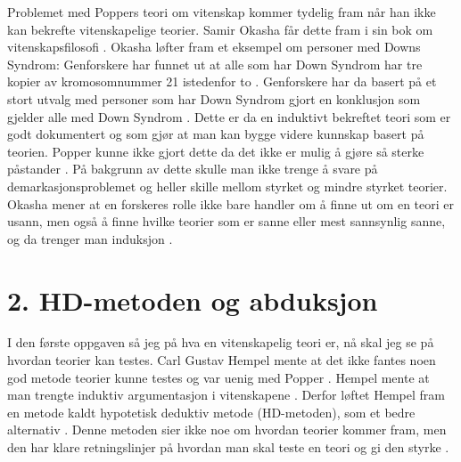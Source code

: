 \documentclass[
]{book}
\begin{document}
Problemet med Poppers teori om vitenskap kommer tydelig fram når han ikke kan bekrefte vitenskapelige teorier. Samir Okasha får dette fram i sin bok om vitenskapsfilosofi \citep{okasha2016}. Okasha løfter fram et eksempel om personer med Downs Syndrom: Genforskere har funnet ut at alle som har Down Syndrom har tre kopier av kromosomnummer 21 istedenfor to \citep[s. 18]{okasha2016}. Genforskere har da basert på et stort utvalg med personer som har Down Syndrom gjort en konklusjon som gjelder alle med Down Syndrom \citep{okasha2016}. Dette er da en induktivt bekreftet teori som er godt dokumentert og som gjør at man kan bygge videre kunnskap basert på teorien. Popper kunne ikke gjort dette da det ikke er mulig å gjøre så sterke påstander \citep{okasha2016}. På bakgrunn av dette skulle man ikke trenge å svare på demarkasjonsproblemet og heller skille mellom styrket og mindre styrket teorier. Okasha mener at en forskeres rolle ikke bare handler om å finne ut om en teori er usann, men også å finne hvilke teorier som er sanne eller mest sannsynlig sanne, og da trenger man induksjon \citep[s. 19-20]{okasha2016}.

\hypertarget{hd-metoden-og-abduksjon}{%
\section{2. HD-metoden og abduksjon}\label{hd-metoden-og-abduksjon}}

I den første oppgaven så jeg på hva en vitenskapelig teori er, nå skal jeg se på hvordan teorier kan testes. Carl Gustav Hempel mente at det ikke fantes noen god metode teorier kunne testes og var uenig med Popper \citep{hempel1966}. Hempel mente at man trengte induktiv argumentasjon i vitenskapene \citep{hempel1966}. Derfor løftet Hempel fram en metode kaldt hypotetisk deduktiv metode (HD-metoden), som et bedre alternativ \citep{hempel1966}. Denne metoden sier ikke noe om hvordan teorier kommer fram, men den har klare retningslinjer på hvordan man skal teste en teori og gi den styrke \citep{hempel1966}.
\end{document}
